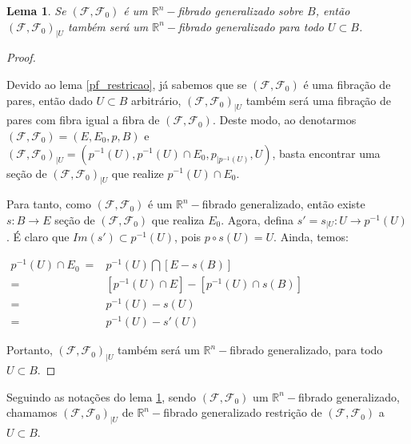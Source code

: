 \documentclass[12pt,oneside]{book} %
\newtheorem{lem}    {\hspace{0.5cm}Lema}[chapter]
\newcommand{\R}{\mathbb{R}}
\begin{document}
\begin{lem}\label{fht_restricao}
	Se $(\mathcal{F},\mathcal{F}_{0})$ é um $\R^{n}-$fibrado generalizado sobre $B$, então $(\mathcal{F},\mathcal{F}_{0})_{|U}$ também será um $\R^{n}-$fibrado generalizado para todo $U\subset B$.
\end{lem}
\begin{proof}
	
	\
	
	\par Devido ao lema \ref{pf_restricao}, já sabemos que se $(\mathcal{F},\mathcal{F}_{0})$ é uma fibração de pares, então dado $U\subset B$ arbitrário, $(\mathcal{F},\mathcal{F}_{0})_{|U}$ também será uma fibração de pares com fibra igual a fibra de $(\mathcal{F},\mathcal{F}_{0})$. Deste modo, ao denotarmos $(\mathcal{F},\mathcal{F}_{0})=(E,E_{0},p,B)$ e $(\mathcal{F},\mathcal{F}_{0})_{|U}=(p^{-1}(U),p^{-1}(U)\cap E_{0},p_{|p^{-1}(U)},U)$, basta encontrar uma seção de $(\mathcal{F},\mathcal{F}_{0})_{|U}$ que realize $p^{-1}(U)\cap E_{0}$.
	
	\par Para tanto, como $(\mathcal{F},\mathcal{F}_{0})$ é um $\R^{n}-$fibrado generalizado, então existe $s:B\to E$ seção de $(\mathcal{F},\mathcal{F}_{0})$ que realiza $E_{0}$. Agora, defina $s'=s_{|U}:U\to p^{-1}(U)$. É claro que $Im(s')\subset p^{-1}(U)$, pois $p\circ s(U)=U$. Ainda, temos: \newline
	
	$\begin{array}{rl}
		p^{-1}(U)\cap E_{0} \ = & p^{-1}(U)\bigcap [E-s(B)] \\
		= & [p^{-1}(U)\cap E]-[p^{-1}(U)\cap s(B)] \\
		= & p^{-1}(U)-s(U) \\
		= & p^{-1}(U)-s'(U)
	\end{array}$ \newline
	
	\par Portanto, $(\mathcal{F},\mathcal{F}_{0})_{|U}$ também será um $\R^{n}-$fibrado generalizado, para todo $U\subset B$.
	
\end{proof}

\par Seguindo as notações do lema \ref{fht_restricao}, sendo $(\mathcal{F},\mathcal{F}_{0})$ um $\R^{n}-$fibrado generalizado, chamamos $(\mathcal{F},\mathcal{F}_{0})_{|U}$ de $\R^{n}-$fibrado generalizado restrição de $(\mathcal{F},\mathcal{F}_{0})$ a $U\subset B$.
\end{document}
